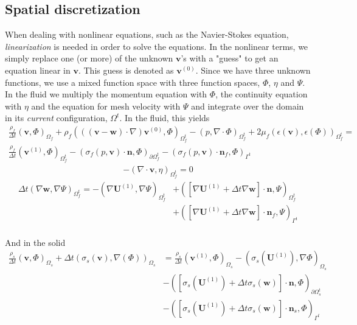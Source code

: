 \subsection{Spatial discretization}
When dealing with nonlinear equations, such as the Navier-Stokes equation, \textit{linearization} is needed in order to solve the equations. In the nonlinear terms, we simply replace one (or more) of the unknown $\mathbf{v}$'s with a "guess" to get an equation linear in $\mathbf{v}$. This guess is denoted as $\mathbf{v}^{(0)}$. Since we have three unknown functions, we use a mixed function space with three function spaces, $\Phi$, $\eta$ and $\Psi$. In the fluid we multiply the momentum equation with $\Phi$, the continuity equation with $\eta$ and the equation for mesh velocity with $\Psi$ and integrate over the domain in its \textit{current} configuration, $\Omega^t$. In the fluid, this yields
\begin{align}
\frac{\rho_f}{\Delta t}(\mathbf{v},\Phi)_{\Omega_f} + \rho_f(((\mathbf{v}-\mathbf{w})\cdot \nabla) \mathbf{v}^{(0)}, \Phi)_{\Omega_f^t} - (p,\nabla \cdot \Phi)_{\Omega_f^t} + 2\mu_f(\epsilon(\mathbf{v}), \epsilon(\Phi))_{\Omega_f^t} = \\ 
\frac{\rho_f}{\Delta t}(\mathbf{v}^{(1)},\Phi)_{\Omega_f^t} - (\sigma_f(p,\mathbf{v})\cdot \mathbf{n}, \Phi)_{\partial \Omega_f^t} - (\sigma_f(p,\mathbf{v}) \cdot \mathbf{n}_f, \Phi)_{\Gamma^t} \label{VarMom}
\end{align}
\begin{align}
-(\nabla \cdot \mathbf{v},\eta)_{\Omega_f^t} = 0 \label{VarCon}
\end{align}
\begin{align}
\Delta t(\nabla \mathbf{w}, \nabla \Psi)_{\Omega_f^t} = - (\nabla \mathbf{U}^{(1)}, \nabla \Psi)_{\Omega_f^t} & + ([\nabla \mathbf{U}^{(1)} + \Delta t \nabla \mathbf{w}] \cdot \mathbf{n}, \Psi)_{\Omega_f^t} \\ 
& + ([\nabla \mathbf{U}^{(1)} + \Delta t \nabla \mathbf{w}] \cdot \mathbf{n}_f, \Psi)_{\Gamma^t} \label{VarMesh}
\end{align}
\\
And in the solid
\begin{align}
\frac{\rho_s}{\Delta t}(\mathbf{v},\Phi)_{\Omega_s} + \Delta t (\sigma_s (\mathbf{v}), \nabla(\Phi))_{\Omega_s} & = \frac{\rho_s}{\Delta t}(\mathbf{v}^{(1)},\Phi)_{\Omega_s} - (\sigma_s(\mathbf{U}^{(1)}), \nabla \Phi)_{\Omega_s} \\
& - ([\sigma_s(\mathbf{U}^{(1)}) + \Delta t \sigma_s(\mathbf{w})]\cdot \mathbf{n}, \Phi)_{\partial \Omega_s^t} \\
& - ([\sigma_s(\mathbf{U}^{(1)}) + \Delta t \sigma_s(\mathbf{w})]\cdot \mathbf{n}_s, \Phi)_{\Gamma^t} \label{VarMom2}
\end{align}
